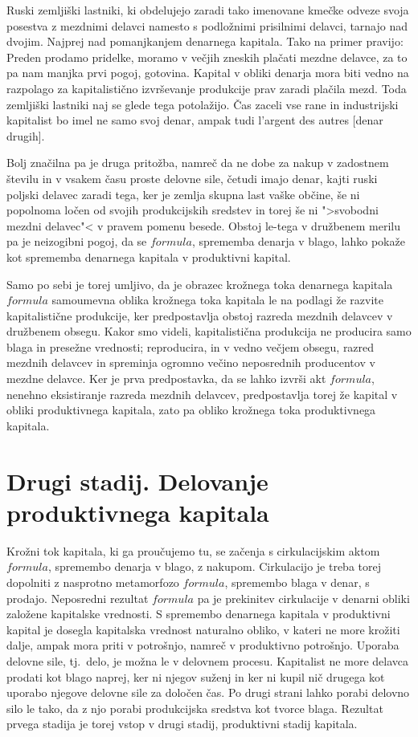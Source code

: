\documentclass[kapital_02.tex]{subfiles}
\begin{document}
Ruski zemljiški lastniki, ki obdelujejo zaradi tako imenovane kmečke odveze svoja posestva z mezdnimi delavci namesto s podložnimi prisilnimi delavci, tarnajo nad dvojim. Najprej nad pomanjkanjem denarnega kapitala. Tako na primer pravijo: Preden prodamo pridelke, moramo v večjih zneskih plačati mezdne delavce, za to pa nam manjka prvi pogoj, gotovina. Kapital v obliki denarja mora biti vedno na razpolago za kapitalistično izvrševanje produkcije prav zaradi plačila mezd. Toda zemljiški lastniki naj se glede tega potolažijo. Čas zaceli vse rane in industrijski kapitalist bo imel ne samo svoj denar, ampak tudi l'argent des autres [denar drugih].

Bolj značilna pa je druga pritožba, namreč da ne dobe za nakup v zadostnem številu in v vsakem času proste delovne sile, četudi imajo denar, kajti ruski poljski delavec zaradi tega, ker je zemlja skupna last vaške občine, še ni popolnoma ločen od svojih produkcijskih sredstev in torej še ni ">svobodni mezdni delavec"< v pravem pomenu besede. Obstoj le-tega v družbenem merilu pa je neizogibni pogoj, da se \( formula \), sprememba denarja v blago, lahko pokaže kot sprememba denarnega kapitala v produktivni kapital.

Samo po sebi je torej umljivo, da je obrazec krožnega toka denarnega kapitala \( formula \) samoumevna oblika krožnega toka kapitala le na podlagi že razvite kapitalistične produkcije, ker predpostavlja obstoj razreda mezdnih delavcev v družbenem obsegu. Kakor smo videli, kapitalistična produkcija ne producira samo blaga in presežne vrednosti; reproducira, in v vedno večjem obsegu, razred mezdnih delavcev in spreminja ogromno večino neposrednih producentov v mezdne delavce. Ker je prva predpostavka, da se lahko izvrši akt \( formula \), nenehno eksistiranje razreda mezdnih delavcev, predpostavlja torej že kapital v obliki produktivnega kapitala, zato pa obliko krožnega toka produktivnega kapitala.

\section{Drugi stadij. Delovanje produktivnega kapitala}

Krožni tok kapitala, ki ga proučujemo tu, se začenja s cirkulacijskim aktom \( formula \), spremembo denarja v blago, z nakupom. Cirkulacijo je treba torej dopolniti z nasprotno metamorfozo \( formula \), spremembo blaga v denar, s prodajo. Neposredni rezultat \( formula \) pa je prekinitev cirkulacije v denarni obliki založene kapitalske vrednosti. S spremembo denarnega kapitala v produktivni kapital je dosegla kapitalska vrednost naturalno obliko, v kateri ne more krožiti dalje, ampak mora priti v potrošnjo, namreč v produktivno potrošnjo. Uporaba delovne sile, tj.\ delo, je možna le v delovnem procesu. Kapitalist ne more delavca prodati kot blago naprej, ker ni njegov suženj in ker ni kupil nič drugega kot uporabo njegove delovne sile za določen čas. Po drugi strani lahko porabi delovno silo le tako, da z njo porabi produkcijska sredstva kot tvorce blaga. Rezultat prvega stadija je torej vstop v drugi stadij, produktivni stadij kapitala.
\end{document}
